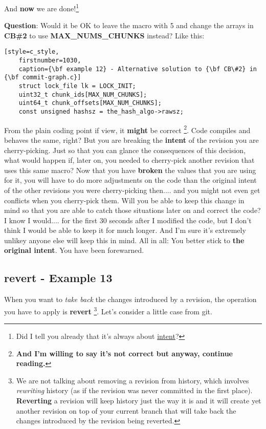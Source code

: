 And {\bf now} we are done!\footnote{Did I tell you already that it's always about \hyperref[intent]{intent}?}

{\bf Question}: Would it be OK to leave the macro with 5 and change the arrays in {\bf CB\#2} to use {\bf MAX\_NUMS\_CHUNKS} instead?
Like this:

\begin{lstlisting}[style=c_style,
	firstnumber=1030,
	caption={\bf example 12} - Alternative solution to {\bf CB\#2} in {\bf commit-graph.c}]
	struct lock_file lk = LOCK_INIT;
	uint32_t chunk_ids[MAX_NUM_CHUNKS];
	uint64_t chunk_offsets[MAX_NUM_CHUNKS];
	const unsigned hashsz = the_hash_algo->rawsz;
\end{lstlisting}

From the plain coding point if view, it {\bf might} be correct
\footnote{\bf And I'm willing to say it's not correct but anyway, continue reading.}.
Code compiles and behaves the same, right? But you are breaking the {\bf intent} of the revision you are cherry-picking. Just so that you
can glance the consequences of this decision, what would happen if, later on, you needed to cherry-pick another revision that uses this
same macro? Now that you have {\bf broken} the values that you are using for it, you will have to do more adjustments on the code than
the original intent of the other revisions you were cherry-picking then.... and you might not even get conflicts when you cherry-pick
them. Will you be able to keep this change in mind so that you are able to catch those situations later on and correct the code?
I know I would.... for the first 30 seconds after I modified the code, but I don't think I would be able to keep it for much longer.
And I'm sure it's extremely unlikey anyone else will keep this in mind. All in all: You better stick to {\bf the original intent}.
You have been forewarned.

\subsection{revert - Example 13}
\label{revert}
\label{example_13}

When you want to {\it take back} the changes introduced by a revision, the operation you have to apply is {\bf revert}
\footnote{We are not talking about removing a revision from history, which involves {\it rewriting} history (as if the revision
was never committed in the first place). {\bf Reverting} a revision will keep history just the way it is and it will create yet
another revision on top of your current branch that will take back the changes introduced by the revision being reverted.}. Let's
consider a little case from git.

